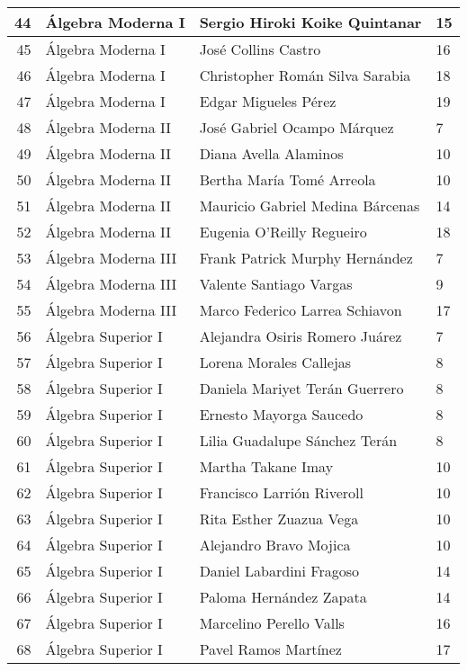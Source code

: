 \begin{table}[ht]
\begin{tabular}{rlll}
44 & Álgebra Moderna I & Sergio Hiroki Koike Quintanar & 15 \\ \hline
45 & Álgebra Moderna I & José Collins Castro & 16 \\ \hline
46 & Álgebra Moderna I & Christopher Román Silva Sarabia & 18 \\ \hline
47 & Álgebra Moderna I & Edgar Migueles Pérez & 19 \\ \hline
48 & Álgebra Moderna II & José Gabriel Ocampo Márquez & 7 \\ \hline
49 & Álgebra Moderna II & Diana Avella Alaminos & 10 \\ \hline
50 & Álgebra Moderna II & Bertha María Tomé Arreola & 10 \\ \hline
51 & Álgebra Moderna II & Mauricio Gabriel Medina Bárcenas & 14 \\ \hline
52 & Álgebra Moderna II & Eugenia O'Reilly Regueiro & 18 \\ \hline
  53 & Álgebra Moderna III & Frank Patrick Murphy Hernández & 7 \\ \hline
  54 & Álgebra Moderna III & Valente Santiago Vargas & 9 \\ \hline
  55 & Álgebra Moderna III & Marco Federico Larrea Schiavon & 17 \\ \hline
  56 & Álgebra Superior I & Alejandra Osiris Romero Juárez & 7 \\ \hline
  57 & Álgebra Superior I & Lorena Morales Callejas & 8 \\ \hline
  58 & Álgebra Superior I & Daniela Mariyet Terán Guerrero & 8 \\ \hline
  59 & Álgebra Superior I & Ernesto Mayorga Saucedo & 8 \\ \hline
  60 & Álgebra Superior I & Lilia Guadalupe Sánchez Terán & 8 \\ \hline
  61 & Álgebra Superior I & Martha Takane Imay & 10 \\ \hline
  62 & Álgebra Superior I & Francisco Larrión Riveroll & 10 \\ \hline
  63 & Álgebra Superior I & Rita Esther Zuazua Vega & 10 \\ \hline
  64 & Álgebra Superior I & Alejandro Bravo Mojica & 10 \\ \hline
  65 & Álgebra Superior I & Daniel Labardini Fragoso & 14 \\ \hline
  66 & Álgebra Superior I & Paloma Hernández Zapata & 14 \\ \hline
  67 & Álgebra Superior I & Marcelino Perello Valls & 16 \\ \hline
  68 & Álgebra Superior I & Pavel Ramos Martínez & 17 \\ \hline

\end{tabular}
\end{table}
